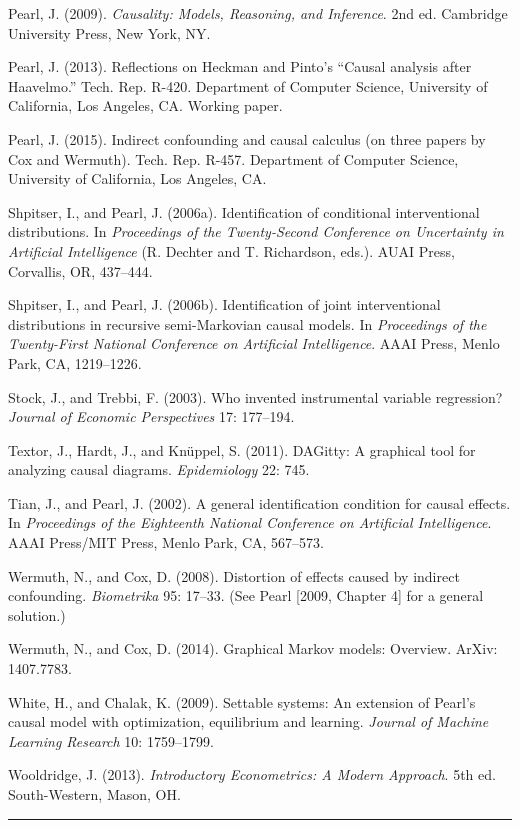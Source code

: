 \documentclass[11pt,a5paper,twoside]{book}
\begin{document}
Pearl, J. (2009). \textit{Causality: Models, Reasoning, and Inference}. 2nd ed. Cambridge University Press, New York, NY.

Pearl, J. (2013). Reflections on Heckman and Pinto’s “Causal analysis after Haavelmo.” Tech. Rep. R-420. Department of Computer Science, University of California, Los Angeles, CA. Working paper.

Pearl, J. (2015). Indirect confounding and causal calculus (on three papers by Cox and Wermuth). Tech. Rep. R-457. Department of Computer Science, University of California, Los Angeles, CA.

Shpitser, I., and Pearl, J. (2006a). Identification of conditional interventional distributions. In \textit{Proceedings of the Twenty-Second Conference on Uncertainty in Artificial Intelligence} (R. Dechter and T. Richardson, eds.). AUAI Press, Corvallis, OR, 437–444.

Shpitser, I., and Pearl, J. (2006b). Identification of joint interventional distributions in recursive semi-Markovian causal models. In \textit{Proceedings of the Twenty-First National Conference on Artificial Intelligence}. AAAI Press, Menlo Park, CA, 1219–1226.

Stock, J., and Trebbi, F. (2003). Who invented instrumental variable regression? \textit{Journal of Economic Perspectives} 17: 177–194.

Textor, J., Hardt, J., and Knüppel, S. (2011). DAGitty: A graphical tool for analyzing causal diagrams. \textit{Epidemiology} 22: 745.

Tian, J., and Pearl, J. (2002). A general identification condition for causal effects. In \textit{Proceedings of the Eighteenth National Conference on Artificial Intelligence}. AAAI Press/MIT Press, Menlo Park, CA, 567–573.

Wermuth, N., and Cox, D. (2008). Distortion of effects caused by indirect confounding. \textit{Biometrika} 95: 17–33. (See Pearl [2009, Chapter 4] for a general solution.)

Wermuth, N., and Cox, D. (2014). Graphical Markov models: Overview. ArXiv: 1407.7783.

White, H., and Chalak, K. (2009). Settable systems: An extension of Pearl’s causal model with optimization, equilibrium and learning. \textit{Journal of Machine Learning Research} 10: 1759–1799.

Wooldridge, J. (2013). \textit{Introductory Econometrics: A Modern Approach}. 5th ed. South-Western, Mason, OH.

\vspace{1em}\hrule\vspace{1em}
\end{document}
